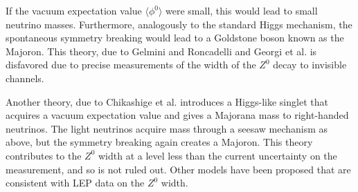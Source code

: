 \documentclass[herrin-thesis.tex]{subfiles}
\begin{document}
If the vacuum expectation value \(\langle\phi^0\rangle\) were small, this would lead to small neutrino masses. Furthermore, analogously to the standard Higgs mechanism, the spontaneous symmetry breaking would lead to a Goldstone boson known as the Majoron. This theory, due to Gelmini and Roncadelli \cite{Gelmini:1981uq} and Georgi et al. \cite{Georgi:1981kx} is disfavored due to precise measurements of the width of the \(Z^{0}\) decay to invisible channels.

Another theory, due to Chikashige et al. \cite{Chikashige:1981vn} introduces a Higgs-like singlet that acquires a vacuum expectation value and gives a Majorana mass to right-handed neutrinos. The light neutrinos acquire mass through a seesaw mechanism as above, but the symmetry breaking again creates a Majoron. This theory contributes to the \(Z^{0}\) width at a level less than the current uncertainty on the measurement, and so is not ruled out. Other models have been proposed that are consistent with LEP data \cite{Berezhiani199299,Bamert:1995fk} on the \(Z^{0}\) width.
\end{document}
